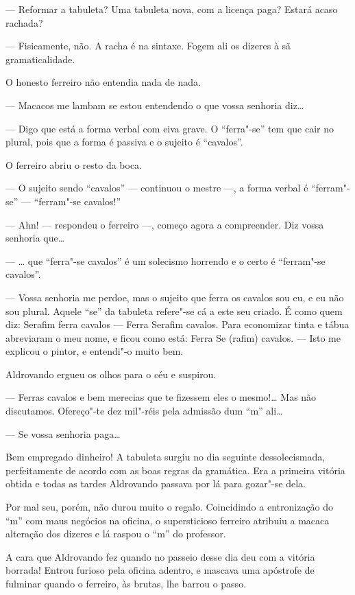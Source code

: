 --- Reformar a tabuleta? Uma tabuleta nova, com a licença paga? Estará
acaso rachada?

--- Fisicamente, não. A racha é na sintaxe. Fogem ali os dizeres à sã
gramaticalidade.

O honesto ferreiro não entendia nada de nada.

--- Macacos me lambam se estou entendendo o que vossa senhoria diz\ldots{}

--- Digo que está a forma verbal com eiva grave. O ``ferra"-se'' tem que
cair no plural, pois que a forma é passiva e o sujeito é ``cavalos''.

O ferreiro abriu o resto da boca.

--- O sujeito sendo ``cavalos'' --- continuou o mestre ---, a forma
verbal é ``ferram"-se'' --- ``ferram"-se cavalos!''

--- Ahn! --- respondeu o ferreiro ---, começo agora a compreender. Diz
vossa senhoria que\ldots{}

--- \ldots{} que ``ferra"-se cavalos'' é um solecismo horrendo e o certo é
``ferram"-se cavalos''.

--- Vossa senhoria me perdoe, mas o sujeito que ferra os cavalos sou eu,
e eu não sou plural. Aquele ``se'' da tabuleta refere"-se cá a este seu
criado. É como quem diz: Serafim ferra cavalos --- Ferra Serafim
cavalos. Para economizar tinta e tábua abreviaram o meu nome, e ficou
como está: Ferra Se (rafim) cavalos. --- Isto me explicou o pintor, e
entendi"-o muito bem.

Aldrovando ergueu os olhos para o céu e suspirou.

--- Ferras cavalos e bem merecias que te fizessem eles o mesmo!\ldots{} Mas
não discutamos. Ofereço"-te dez mil"-réis pela admissão dum ``m'' ali\ldots{}

--- Se vossa senhoria paga\ldots{}

Bem empregado dinheiro! A tabuleta surgiu no dia seguinte
dessolecismada, perfeitamente de acordo com as boas regras da gramática.
Era a primeira vitória obtida e todas as tardes Aldrovando passava por
lá para gozar"-se dela.

Por mal seu, porém, não durou muito o regalo. Coincidindo a entronização
do ``m'' com maus negócios na oficina, o supersticioso ferreiro atribuiu
a macaca alteração dos dizeres e lá raspou o ``m'' do professor.

A cara que Aldrovando fez quando no passeio desse dia deu com a vitória
borrada! Entrou furioso pela oficina adentro, e mascava uma apóstrofe de
fulminar quando o ferreiro, às brutas, lhe barrou o passo.

